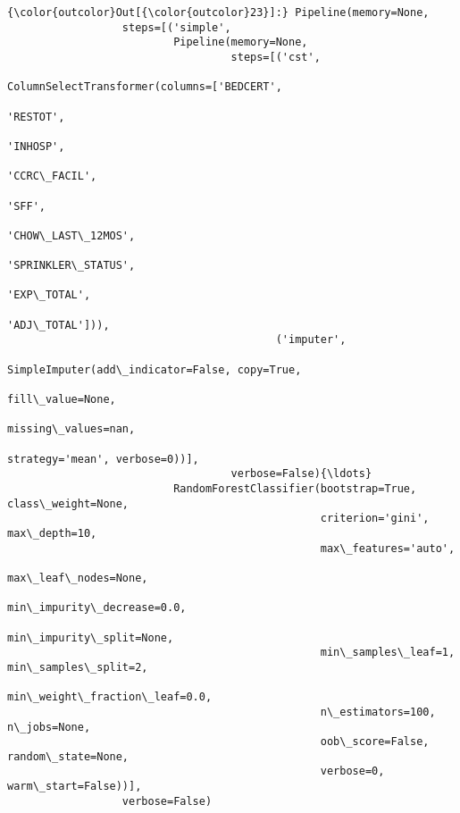 \documentclass[11pt]{article}
\begin{document}
\begin{Verbatim}[commandchars=\\\{\}]
{\color{outcolor}Out[{\color{outcolor}23}]:} Pipeline(memory=None,
                  steps=[('simple',
                          Pipeline(memory=None,
                                   steps=[('cst',
                                           ColumnSelectTransformer(columns=['BEDCERT',
                                                                            'RESTOT',
                                                                            'INHOSP',
                                                                            'CCRC\_FACIL',
                                                                            'SFF',
                                                                            'CHOW\_LAST\_12MOS',
                                                                            'SPRINKLER\_STATUS',
                                                                            'EXP\_TOTAL',
                                                                            'ADJ\_TOTAL'])),
                                          ('imputer',
                                           SimpleImputer(add\_indicator=False, copy=True,
                                                         fill\_value=None,
                                                         missing\_values=nan,
                                                         strategy='mean', verbose=0))],
                                   verbose=False){\ldots}
                          RandomForestClassifier(bootstrap=True, class\_weight=None,
                                                 criterion='gini', max\_depth=10,
                                                 max\_features='auto',
                                                 max\_leaf\_nodes=None,
                                                 min\_impurity\_decrease=0.0,
                                                 min\_impurity\_split=None,
                                                 min\_samples\_leaf=1, min\_samples\_split=2,
                                                 min\_weight\_fraction\_leaf=0.0,
                                                 n\_estimators=100, n\_jobs=None,
                                                 oob\_score=False, random\_state=None,
                                                 verbose=0, warm\_start=False))],
                  verbose=False)
\end{Verbatim}
            
\end{document}
